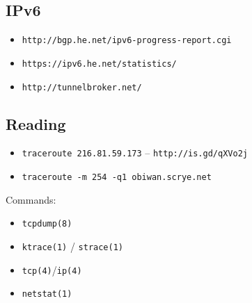 \documentclass[xga]{xdvislides}
\begin{document}
\subsection{IPv6}
\begin{itemize}
	\item \verb+http://bgp.he.net/ipv6-progress-report.cgi+
	\item \verb+https://ipv6.he.net/statistics/+
	\item \verb+http://tunnelbroker.net/+
\end{itemize}

\subsection{Reading}
\begin{itemize}
	\item \verb+traceroute 216.81.59.173+ -- \verb+http://is.gd/qXVo2j+
	\item \verb+traceroute -m 254 -q1 obiwan.scrye.net+
\end{itemize}
\vspace{.5in}
Commands:
\begin{itemize}
	\item \verb+tcpdump(8)+
	\item \verb+ktrace(1)+ / \verb+strace(1)+
	\item \verb+tcp(4)+/\verb+ip(4)+
	\item \verb+netstat(1)+
\end{itemize}
\end{document}
